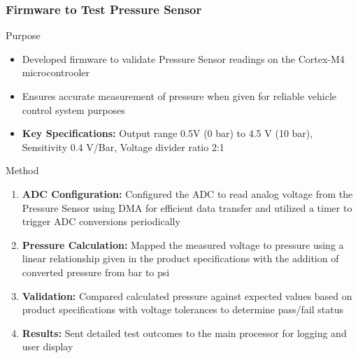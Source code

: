 \documentclass[8pt,compress,aspectratio=169]{beamer}
\newcommand\LightBold[1]{\textcolor{VSBlueLight}{\textbf{#1}}}
\begin{document}
\begin{frame}
    \frametitle{Firmware to Test Pressure Sensor}
    \begin{block}{Purpose}
        \small{
            \begin{itemize}
                \item Developed firmware to validate Pressure Sensor readings on the Cortex-M4 microcontrooler
                \item Ensures accurate measurement of pressure when given for reliable vehicle control system purposes
                \item \LightBold{Key Specifications:} Output range 0.5V (0 bar) to 4.5 V (10 bar), Sensitivity 0.4 V/Bar, Voltage divider ratio 2:1
            \end{itemize}
        }
    \end{block}
    \hspace{-0.5cm}
    \begin{minipage}{0.485\textwidth}
        \begin{block}{Method}
            \small{
                \begin{enumerate}
                    \tiny
                    \item \LightBold{ADC Configuration:} Configured the ADC to read analog voltage from the Pressure Sensor using DMA for efficient data transfer and utilized a timer to trigger ADC conversions periodically
                    \item \LightBold{Pressure Calculation:} Mapped the measured voltage to pressure using a linear relationship given in the product specifications with the addition of converted pressure from bar to psi
                    \item \LightBold{Validation:} Compared calculated pressure against expected values based on product specifications with voltage tolerances to determine pass/fail status
                    \item \LightBold{Results:} Sent detailed test outcomes to the main processor for logging and user display

\end{enumerate}}
\end{block}
\end{minipage}
\end{frame}
\end{document}
